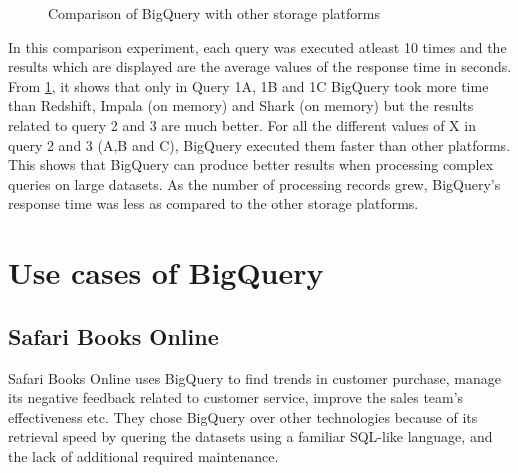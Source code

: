 \documentclass[9pt,twocolumn,twoside]{../../styles/osajnl}
\begin{document}
\begin{figure}[htbp]
\centering
{}
\caption{\cite{www-benchmarks-bigguery} Comparison of BigQuery with
  other storage platforms}
\label{fig:experiments}
\end{figure}

\noindent
In this comparison experiment, each query was executed atleast 10
times and the results which are displayed are the average values of
the response time in seconds. From \ref{fig:experiments}, it shows
that only in Query 1A, 1B and 1C BigQuery took more time than
Redshift, Impala (on memory) and Shark (on memory) but the results
related to query 2 and 3 are much better. For all the different values
of X in query 2 and 3 (A,B and C), BigQuery executed them faster than
other platforms. This shows that BigQuery can produce better results
when processing complex queries on large datasets. As the number of
processing records grew, BigQuery's response time was less as compared
to the other storage platforms.

\section{Use cases of BigQuery}
\subsection{Safari Books Online}
Safari Books Online \cite{www-usecase-safari} uses BigQuery to find
trends in customer purchase, manage its negative feedback related to
customer service, improve the sales team's effectiveness etc. They
chose BigQuery over other technologies because of its retrieval speed
by quering the datasets using a familiar SQL-like language, and the
lack of additional required maintenance.
\end{document}
